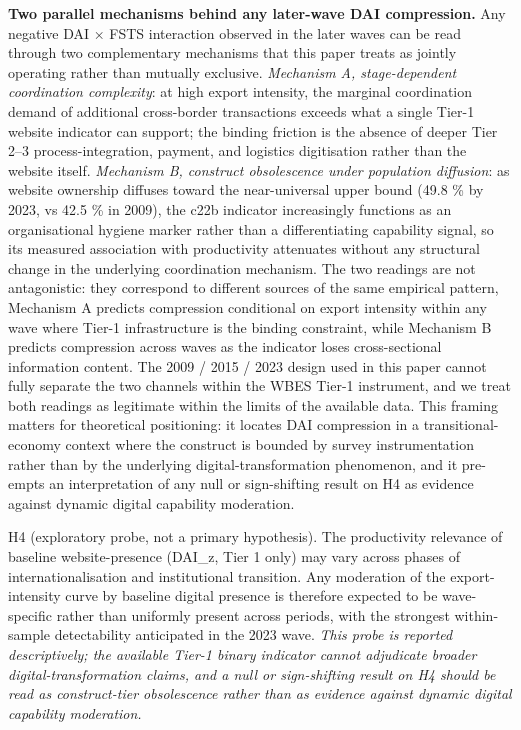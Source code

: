 \documentclass[12pt,a4paper]{article}
\begin{document}
\textbf{Two parallel mechanisms behind any later-wave DAI compression.}
Any negative DAI × FSTS interaction observed in the later waves can be
read through two complementary mechanisms that this paper treats as
jointly operating rather than mutually exclusive. \emph{Mechanism A,
stage-dependent coordination complexity}: at high export intensity, the
marginal coordination demand of additional cross-border transactions
exceeds what a single Tier-1 website indicator can support; the binding
friction is the absence of deeper Tier 2--3 process-integration,
payment, and logistics digitisation rather than the website itself.
\emph{Mechanism B, construct obsolescence under population diffusion}:
as website ownership diffuses toward the near-universal upper bound
(49.8 \% by 2023, vs 42.5 \% in 2009), the c22b indicator increasingly
functions as an organisational hygiene marker rather than a
differentiating capability signal, so its measured association with
productivity attenuates without any structural change in the underlying
coordination mechanism. The two readings are not antagonistic: they
correspond to different sources of the same empirical pattern, Mechanism
A predicts compression conditional on export intensity within any wave
where Tier-1 infrastructure is the binding constraint, while Mechanism B
predicts compression across waves as the indicator loses cross-sectional
information content. The 2009 / 2015 / 2023 design used in this paper
cannot fully separate the two channels within the WBES Tier-1
instrument, and we treat both readings as legitimate within the limits
of the available data. This framing matters for theoretical positioning:
it locates DAI compression in a transitional-economy context where the
construct is bounded by survey instrumentation rather than by the
underlying digital-transformation phenomenon, and it pre-empts an
interpretation of any null or sign-shifting result on H4 as evidence
against dynamic digital capability moderation.

H4 (exploratory probe, not a primary hypothesis). The productivity
relevance of baseline website-presence (DAI\_z, Tier 1 only) may vary
across phases of internationalisation and institutional transition. Any
moderation of the export-intensity curve by baseline digital presence is
therefore expected to be wave-specific rather than uniformly present
across periods, with the strongest within-sample detectability
anticipated in the 2023 wave. \emph{This probe is reported
descriptively; the available Tier-1 binary indicator cannot adjudicate
broader digital-transformation claims, and a null or sign-shifting
result on H4 should be read as construct-tier obsolescence rather than
as evidence against dynamic digital capability moderation.}
\end{document}
